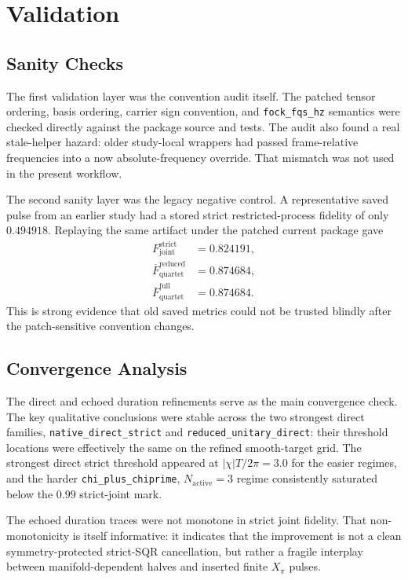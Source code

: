 \documentclass[aps,pra,twocolumn,reprint,floatfix,amsmath,amssymb]{revtex4-2}
\begin{document}
\section{Validation}

\subsection{Sanity Checks}
The first validation layer was the convention audit itself. The patched tensor ordering, basis ordering, carrier sign convention, and \texttt{fock\_fqs\_hz} semantics were checked directly against the package source and tests. The audit also found a real stale-helper hazard: older study-local wrappers had passed frame-relative frequencies into a now absolute-frequency override. That mismatch was not used in the present workflow.

The second sanity layer was the legacy negative control. A representative saved pulse from an earlier study had a stored strict restricted-process fidelity of only $0.494918$. Replaying the same artifact under the patched current package gave
\begin{align}
F_{\mathrm{joint}}^{\mathrm{strict}} &= 0.824191, \\
\overline{F}_{\mathrm{quartet}}^{\mathrm{reduced}} &= 0.874684, \\
\overline{F}_{\mathrm{quartet}}^{\mathrm{full}} &= 0.874684.
\end{align}
This is strong evidence that old saved metrics could not be trusted blindly after the patch-sensitive convention changes.

\subsection{Convergence Analysis}
The direct and echoed duration refinements serve as the main convergence check. The key qualitative conclusions were stable across the two strongest direct families, \texttt{native\_direct\_strict} and \texttt{reduced\_unitary\_direct}: their threshold locations were effectively the same on the refined smooth-target grid. The strongest direct strict threshold appeared at $|\chi|T/2\pi=3.0$ for the easier regimes, and the harder \texttt{chi\_plus\_chiprime}, $N_{\mathrm{active}}=3$ regime consistently saturated below the $0.99$ strict-joint mark.

The echoed duration traces were not monotone in strict joint fidelity. That non-monotonicity is itself informative: it indicates that the improvement is not a clean symmetry-protected strict-SQR cancellation, but rather a fragile interplay between manifold-dependent halves and inserted finite $X_\pi$ pulses.
\end{document}
